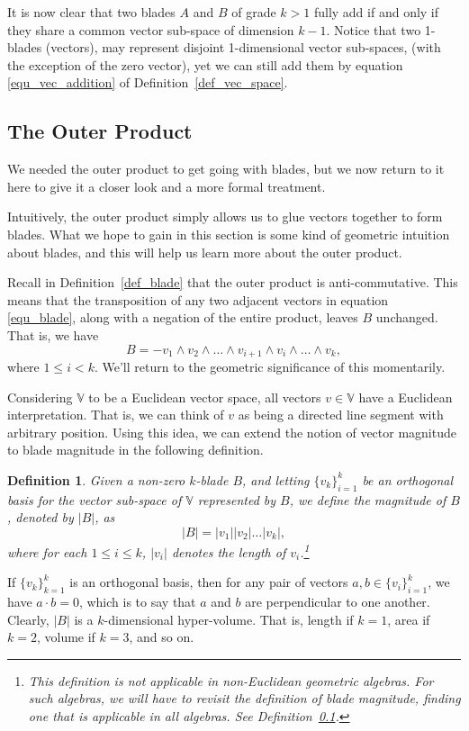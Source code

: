 \documentclass[12pt]{article}
\numberwithin{equation}{section}
\newcommand{\V}{\mathbb{V}}
\newtheorem{definition}{Definition}[section]
\begin{document}
It is now clear that two blades $A$ and $B$ of grade $k>1$ fully add if and only if they
share a common vector sub-space of dimension $k-1$.  Notice that
two 1-blades (vectors), may represent disjoint 1-dimensional vector sub-spaces,
(with the exception of the zero vector), yet we can still add them by
equation \eqref{equ_vec_addition} of Definition~\ref{def_vec_space}.

\subsection{The Outer Product}

We needed the outer product to get going with blades, but we now
return to it here to give it a closer look and a more formal treatment.

Intuitively, the outer product simply allows us to glue vectors
together to form blades.  What we hope to gain in this section
is some kind of geometric intuition about blades, and this will
help us learn more about the outer product.

Recall in Definition~\ref{def_blade} that the outer product is anti-commutative.
This means that the transposition of any two adjacent vectors in
equation \eqref{equ_blade}, along with a negation of the
entire product, leaves $B$ unchanged.  That is, we have
\begin{equation}\label{equ_adj_trans}
B = -v_1\wedge v_2\wedge\dots\wedge v_{i+1}\wedge v_i\wedge\dots\wedge v_k,
\end{equation}
where $1\leq i<k$.  We'll return to the geometric significance of this momentarily.

Considering $\V$ to be a Euclidean vector space, all vectors $v\in\V$ have
a Euclidean interpretation.  That is, we can think of $v$ as being a directed
line segment with arbitrary position.  Using this idea, we can extend the notion
of vector magnitude to blade magnitude in the following definition.
\begin{definition}\label{def_blade_mag}
Given a non-zero $k$-blade $B$, and letting $\{v_k\}_{i=1}^k$ be
an orthogonal basis for the vector sub-space of $\V$ represented
by $B$, we define the magnitude of $B$, denoted by $|B|$, as
\begin{equation}
|B| = |v_1||v_2|\dots |v_k|,
\end{equation}
where for each $1\leq i\leq k$, $|v_i|$ denotes the length of $v_i$.\footnote{This definition is
not applicable in non-Euclidean geometric algebras.  For such algebras, we will have to revisit
the definition of blade magnitude, finding one that is applicable in all algebras.  See Definition~\ref{}.}
\end{definition}
If $\{v_k\}_{k=1}^k$ is an orthogonal basis, then for any pair of vectors $a,b\in\{v_i\}_{i=1}^k$,
we have $a\cdot b=0$, which is to say that $a$ and $b$ are perpendicular to one another.
Clearly, $|B|$ is a $k$-dimensional hyper-volume.  That is, length if $k=1$, area if $k=2$, volume
if $k=3$, and so on.
\end{document}
